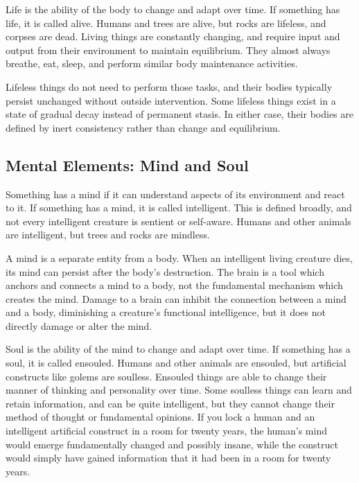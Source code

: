     Life is the ability of the body to change and adapt over time.
    If something has life, it is called alive.
    Humans and trees are alive, but rocks are lifeless, and corpses are dead.
    Living things are constantly changing, and require input and output from their environment to maintain equilibrium.
    They almost always breathe, eat, sleep, and perform similar body maintenance activities.

    Lifeless things do not need to perform those tasks, and their bodies typically persist unchanged without outside intervention.
    Some lifeless things exist in a state of gradual decay instead of permanent stasis.
    In either case, their bodies are defined by inert consistency rather than change and equilibrium.

  \subsection{Mental Elements: Mind and Soul}
    Something has a mind if it can understand aspects of its environment and react to it.
    If something has a mind, it is called intelligent.
    This is defined broadly, and not every intelligent creature is sentient or self-aware.
    Humans and other animals are intelligent, but trees and rocks are mindless.

    A mind is a separate entity from a body.
    When an intelligent living creature dies, its mind can persist after the body's destruction.
    The brain is a tool which anchors and connects a mind to a body, not the fundamental mechanism which creates the mind.
    Damage to a brain can inhibit the connection between a mind and a body, diminishing a creature's functional intelligence, but it does not directly damage or alter the mind.

    Soul is the ability of the mind to change and adapt over time.
    If something has a soul, it is called ensouled.
    Humans and other animals are ensouled, but artificial constructs like golems are soulless.
    Ensouled things are able to change their manner of thinking and personality over time.
    Some soulless things can learn and retain information, and can be quite intelligent, but they cannot change their method of thought or fundamental opinions.
    If you lock a human and an intelligent artificial construct in a room for twenty years, the human's mind would emerge fundamentally changed and possibly insane, while the construct would simply have gained information that it had been in a room for twenty years.


